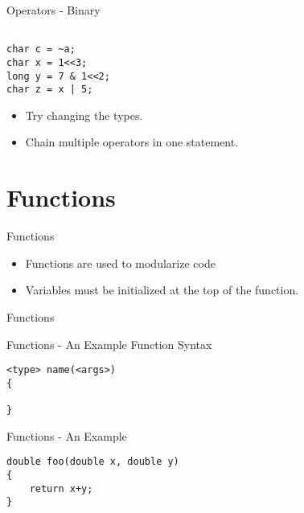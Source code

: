 \documentclass[main.tex]{subfiles}
\begin{document}
\begin{frame}[fragile]{Operators - Binary}
	\begin{lstlisting}

char c = ~a;
char x = 1<<3;
long y = 7 & 1<<2;
char z = x | 5;
	\end{lstlisting}

	\begin{itemize}
		\item Try changing the types. 
		\item Chain multiple operators in one statement.
	\end{itemize}
\end{frame}


\section{Functions} 
\label{sec:functions}

\begin{frame}{Functions}
	\begin{itemize}
		\item Functions are used to modularize code
		\item Variables must be initialized at the top of the function.
	\end{itemize}
\end{frame}

\begin{frame}{Functions}
	\begin{itemize}
	\end{itemize}
\end{frame}

\begin{frame}[fragile]{Functions - An Example}
	Function Syntax
	\begin{lstlisting}
<type> name(<args>)
{

}
	\end{lstlisting}
\end{frame}

\begin{frame}[fragile]{Functions - An Example}
		\begin{lstlisting}
double foo(double x, double y)
{
	return x+y;
}
		\end{lstlisting}
\end{frame}
\end{document}
